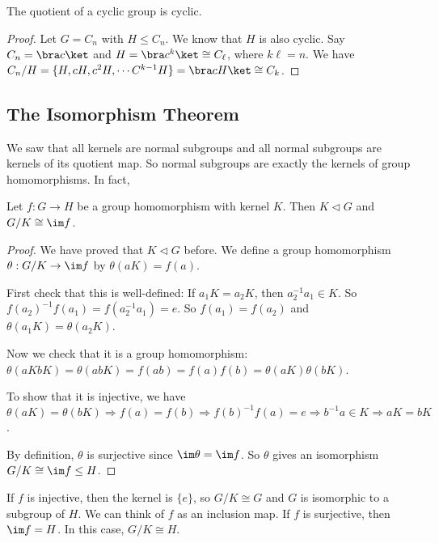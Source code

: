 \documentclass[a4paper]{article}
\begin{document}
\begin{prop}
  The quotient of a cyclic group is cyclic.
\end{prop}

\begin{proof}
  Let $G = C_n$ with $H\leq C_n$. We know that $H$ is also cyclic. Say $C_n = \bra c\ket$ and $H = \bra c^k \ket \cong C_\ell$, where $k\ell = n$. We have $C_n/H = \{H, cH, c^2H, \cdots C^{k - 1}H\}=\bra cH\ket \cong C_k$.
\end{proof}

\subsection{The Isomorphism Theorem}
We saw that all kernels are normal subgroups and all normal subgroups are kernels of its quotient map. So normal subgroups are exactly the kernels of group homomorphisms. In fact,
\begin{thm}
  Let $f:G\to H$ be a group homomorphism with kernel $K$. Then $K\lhd G$ and $G/K\cong \im f$.
\end{thm}

\begin{proof}
  We have proved that $K\lhd G$ before. We define a group homomorphism $\theta: G/K\to \im f$ by $\theta(aK) = f(a)$.

  First check that this is well-defined: If $a_1K = a_2K$, then $a_2^{-1}a_1\in K$. So $f(a_2)^{-1}f(a_1) = f(a_2^{-1}a_1) = e$. So $f(a_1) = f(a_2)$ and $\theta(a_1K) = \theta(a_2 K)$.

  Now we check that it is a group homomorphism: $\theta(aKbK) = \theta(abK) = f(ab) = f(a)f(b) = \theta(aK) \theta(bK)$.

  To show that it is injective, we have $\theta(aK) = \theta(bK) \Rightarrow f(a) = f(b) \Rightarrow f(b)^{-1}f(a)=e\Rightarrow b^{-1}a\in K \Rightarrow aK = bK$.

  By definition, $\theta$ is surjective since $\im \theta = \im f$. So $\theta$ gives an isomorphism $G/K \cong \im f \leq H$.
\end{proof}
\note If $f$ is injective, then the kernel is $\{e\}$, so $G/K\cong G$ and $G$ is isomorphic to a subgroup of $H$. We can think of $f$ as an inclusion map.
\note If $f$ is surjective, then $\im f = H$. In this case, $G/K \cong H$.
\end{document}

